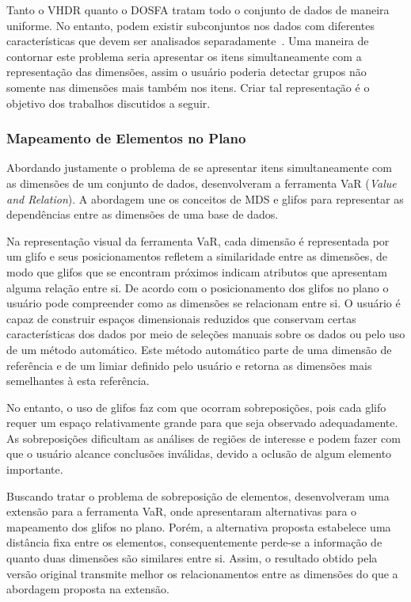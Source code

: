 Tanto o VHDR quanto o DOSFA tratam todo o conjunto de dados
de maneira uniforme. No entanto, podem existir subconjuntos
nos dados com diferentes características que devem ser
analisados separadamente~\cite{May2011}. Uma maneira de
contornar este problema seria apresentar os itens
simultaneamente com a representação das dimensões, assim o
usuário poderia detectar grupos não somente nas dimensões
mais também nos itens. Criar tal representação é o objetivo
dos trabalhos discutidos a seguir.

\subsubsection{Mapeamento de Elementos no Plano}

Abordando justamente o problema de se apresentar itens
simultaneamente com as dimensões de um conjunto de dados,
\citet{Yang2004} desenvolveram a ferramenta VaR (\emph{Value and
Relation}). A abordagem une os conceitos de MDS e glifos para
representar as dependências entre as dimensões de uma base
de dados. 

Na representação visual da ferramenta VaR, cada dimensão é
representada por um glifo e seus posicionamentos refletem a
similaridade entre as dimensões, de modo que glifos que se
encontram próximos indicam atributos que apresentam alguma
relação entre si. De acordo com o posicionamento dos glifos
no plano o usuário pode compreender como as dimensões se
relacionam entre si. O usuário é capaz de construir espaços
dimensionais reduzidos que conservam certas características
dos dados por meio de seleções manuais sobre os dados ou
pelo uso de um método automático.  Este método automático
parte de uma dimensão de referência e de um limiar definido
pelo usuário e retorna as dimensões mais semelhantes à esta
referência.

No entanto, o uso de glifos faz com que ocorram
sobreposições, pois cada glifo requer um espaço
relativamente grande para que seja observado adequadamente.
As sobreposições dificultam as análises de regiões de
interesse e podem fazer com que o usuário alcance conclusões
inválidas, devido a oclusão de algum elemento importante.  

Buscando tratar o problema de sobreposição de elementos,
\citet{Yang2007} desenvolveram uma extensão para a
ferramenta VaR, onde apresentaram alternativas para o
mapeamento dos glifos no plano. Porém, a alternativa
proposta estabelece uma distância fixa entre os elementos,
consequentemente perde-se a informação de quanto duas
dimensões são similares entre si. Assim, o resultado obtido
pela versão original transmite melhor os relacionamentos entre
as dimensões do que a abordagem proposta na extensão. 

